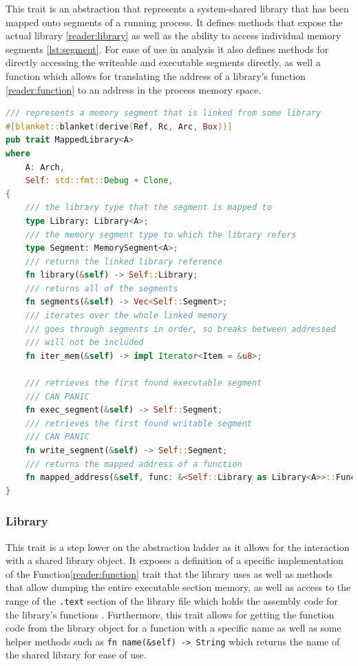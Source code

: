     This trait is an abstraction that represents a system-shared library that has been mapped onto segments of a running process.
    It defines methods that expose the actual library \autoref{reader:library} as well as the ability to access individual memory segments \autoref{lst:segment}.
    For ease of use in analysis it also defines methods for directly accessing the writeable and executable segments directly, as well a function which allows for translating the address of a library's function \autoref{reader:function} to an address in the process memory space.
\begin{lstlisting}[caption=\label{lst:mapped_lib}"The MappedLibrary Trait definition", language=Rust]
 /// represents a memory segment that is linked from some library
#[blanket::blanket(derive(Ref, Rc, Arc, Box))]
pub trait MappedLibrary<A>
where
    A: Arch,
    Self: std::fmt::Debug + Clone,
{
    /// the library type that the segment is mapped to
    type Library: Library<A>;
    /// the memory segment type to which the library refers
    type Segment: MemorySegment<A>;
    /// returns the linked library reference
    fn library(&self) -> Self::Library;
    /// returns all of the segments
    fn segments(&self) -> Vec<Self::Segment>;
    /// iterates over the whole linked memory
    /// goes through segments in order, so breaks between addressed 
    /// will not be included
    fn iter_mem(&self) -> impl Iterator<Item = &u8>;

    /// retrieves the first found executable segment
    /// CAN PANIC
    fn exec_segment(&self) -> Self::Segment;
    /// retrieves the first found writable segment
    /// CAN PANIC
    fn write_segment(&self) -> Self::Segment;
    /// returns the mapped address of a function
    fn mapped_address(&self, func: &<Self::Library as Library<A>>::Function) -> u64;
}   
\end{lstlisting}
  
    \subsubsection{Library}
     \label{reader:library} 
    
    This trait is a step lower on the abstraction ladder as it allows for the interaction with a shared library object.
    It exposes a definition of a specific implementation of the Function\autoref{reader:function} trait that the library uses as well as methods that allow dumping the entire executable section memory, as well as access to the range of the \verb|.text| section of the library file which holds the assembly code for the library's functions \cite{kerrisk_memory_2010}.
    Furthermore, this trait allows for getting the function code from the library object for a function with a specific name as well as some helper methods such as \verb|fn name(&self) -> String| which returns the name of the shared library for ease of use.
    

